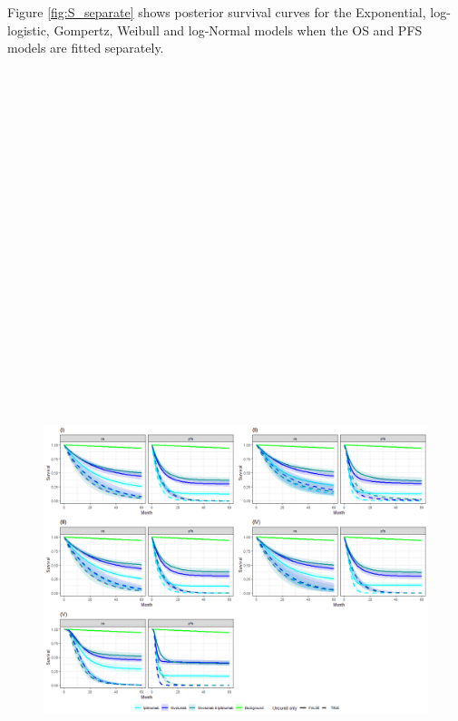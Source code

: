 \documentclass[
]{article}
\begin{document}
Figure \ref{fig:S_separate} shows posterior survival curves for the
Exponential, log-logistic, Gompertz, Weibull and log-Normal models when
the OS and PFS models are fitted separately.

\begin{figure}

{\centering \includegraphics[width=15cm,height=40cm]{../plots/plot_S_samepair_grid_cf_separate_diffuncured} 

}
\end{figure}
\end{document}
